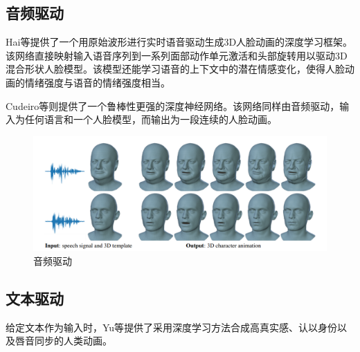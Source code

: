 \documentclass{ctexart}
\begin{document}
\subsection{\hei 音频驱动}
Hai\cite{Hai}等提供了一个用原始波形进行实时语音驱动生成3D人脸动画的深度学习框架。该网络直接映射输入语音序列到一系列面部动作单元激活和头部旋转用以驱动3D混合形状人脸模型。该模型还能学习语音的上下文中的潜在情感变化，使得人脸动画的情绪强度与语音的情绪强度相当。
\par
Cudeiro\cite{Cudeiro}等则提供了一个鲁棒性更强的深度神经网络。该网络同样由音频驱动，输入为任何语言和一个人脸模型，而输出为一段连续的人脸动画。
\begin{figure}[htbp]	
	\centering	
	
			\includegraphics[scale=0.7]{9.png}
	\caption{音频驱动}
\end{figure}
\subsection{\hei 文本驱动}
给定文本作为输入时，Yu等\cite{Yu}提供了采用深度学习方法合成高真实感、认以身份以及唇音同步的人类动画。
\end{document}
